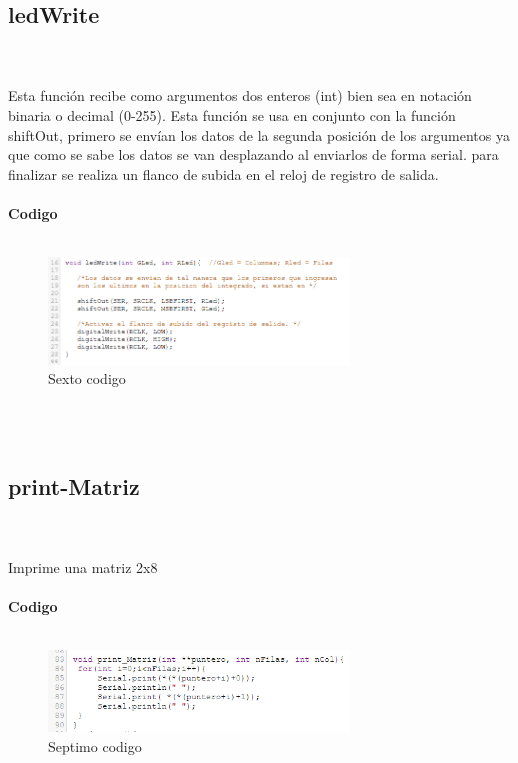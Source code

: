 \documentclass{article}
\begin{document}
\subsection{\large ledWrite}\\\\
Esta función recibe como argumentos dos enteros (int) bien sea en notación binaria o decimal (0-255).
Esta función se usa en conjunto con la función shiftOut, primero se envían los datos de la segunda posición de los argumentos ya que como se sabe los datos se van desplazando al enviarlos de forma serial. para finalizar se realiza un flanco de subida en el reloj de registro de salida.\\
\\
\textbf{\large Codigo}\\\\
\begin{figure}[h]
    \includegraphics[width=8cm]{Imagen9.png}
    \centering
    \caption{Sexto codigo}
    \label{fig:Imagen9}
\end{figure}\\\\

\subsection{\large print-Matriz}\\\\
Imprime una matriz 2x8\\\\

\textbf{\large Codigo}\\\\
\begin{figure}[h]
    \includegraphics[width=8cm]{Imagen11.png}
    \centering
    \caption{Septimo codigo}
    \label{fig:Imagen9}
\end{figure}\\\\
\end{document}
